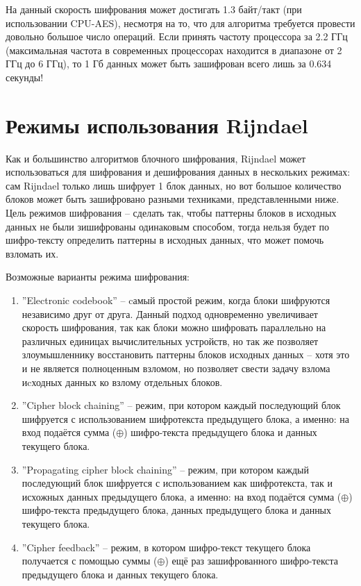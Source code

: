     На данный скорость шифрования может достигать 1.3 байт/такт (при использовании CPU-AES),
    несмотря на то, что для алгоритма требуется
    провести довольно большое число операций. Если принять частоту процессора за 2.2 ГГц (максимальная частота
    в современных процессорах находится в диапазоне от 2 ГГц до 6 ГГц),
    то 1 Гб данных может быть зашифрован всего лишь за 0.634 секунды!

\section{Режимы использования Rijndael}

    Как и большинство алгоритмов блочного шифрования, Rijndael может использоваться для шифрования и дешифрования
    данных в нескольких режимах: сам Rijndael только лишь шифрует 1 блок данных, но вот большое количество блоков
    может быть зашифровано разными техниками, представленными ниже. Цель режимов шифрования -- сделать так,
    чтобы паттерны блоков в исходных данных не были зишифрованы одинаковым способом, тогда нельзя будет по шифро-тексту
    определить паттерны в исходных данных, что может помочь взломать их.

    Возможные варианты режима шифрования:
    \begin{enumerate}
        \item ''Electronic codebook'' -- cамый простой режим, когда блоки шифруются независимо друг от друга. Данный подход
        одновременно увеличивает скорость шифрования, так как блоки можно шифровать параллельно на различных единицах
        вычислительных устройств, но так же позволяет злоумышленнику восстановить паттерны блоков исходных данных --
        хотя это и не является полноценным взломом, но позволяет свести задачу взлома иcходных данных ко взлому отдельных блоков.
        \item ''Cipher block chaining'' -- режим, при котором каждый последующий блок шифруется с использованием
        шифротекста предыдущего блока, а именно: на вход подаётся сумма ($\oplus$) шифро-текста предыдущего блока и данных
        текущего блока.
        \item ''Propagating cipher block chaining'' -- режим, при котором каждый последующий блок шифруется с использованием
        как шифротекста, так и исхожных данных предыдущего блока, а именно: на вход подаётся сумма ($\oplus$) шифро-текста
        предыдущего блока, данных предыдущего блока и данных текущего блока.
        \item ''Cipher feedback'' -- режим, в котором шифро-текст текущего блока получается с помощью суммы ($\oplus$) ещё раз
        зашифрованного шифро-текста предыдущего блока и данных текущего блока.
    \end{enumerate}
